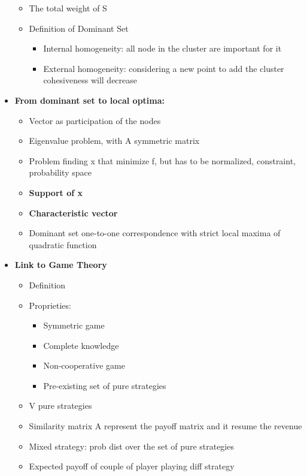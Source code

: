 \begin{itemize}
\begin{itemize}
        \item The total weight of S 
        \item Definition of Dominant Set
        \begin{itemize}
            \item Internal homogeneity: all node in the cluster are important for it
            \item External homogeneity: considering a new point to add the cluster cohesiveness will decrease
        \end{itemize}
    \end{itemize}
    \item \textbf{From dominant set to local optima:}
    \begin{itemize}
        \item Vector as participation of the nodes
        \item Eigenvalue problem, with A symmetric matrix
        \item Problem finding x that minimize f, but has to be normalized, constraint, probability space
        \item \textbf{Support of x}
        \item \textbf{Characteristic vector}
        \item Dominant set one-to-one correspondence with strict local maxima of quadratic function 
    \end{itemize}
    \item \textbf{Link to Game Theory}
    \begin{itemize}
        \item Definition
        \item Proprieties:
        \begin{itemize}
            \item Symmetric game
            \item Complete knowledge
            \item Non-cooperative game
            \item Pre-existing set of pure strategies
        \end{itemize}
        \item V pure strategies
        \item Similarity matrix A represent the payoff matrix and it resume the revenue
        \item Mixed strategy: prob dist over the set of pure strategies
        \item Expected payoff of couple of player playing diff strategy

\end{itemize}
\end{itemize}
